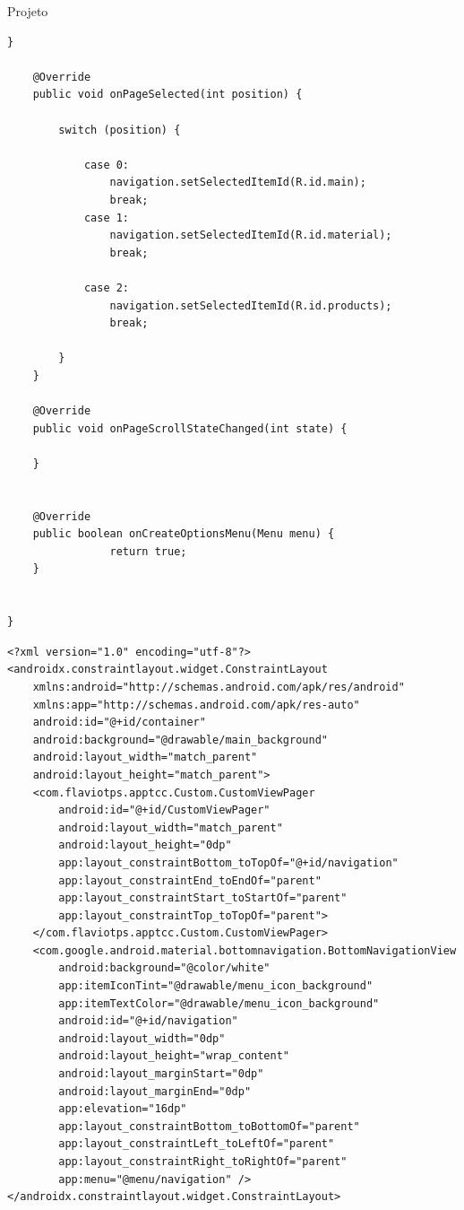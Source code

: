 \documentclass[
	12pt,				%
	openright,			%
	twoside,			%
	a4paper,			%
	english,			%
	french,				%
	spanish,			%
	brazil				%
	]{abntex2}
\begin{document}
\begin{chapter}{Projeto}
\begin{lstlisting}[numbers=none,
basicstyle=\small,
caption={MainActivity.java},
title={MainActivity.java},
label={MainActivity.java}]
    }

    @Override
    public void onPageSelected(int position) {

        switch (position) {

            case 0:
                navigation.setSelectedItemId(R.id.main);
                break;
            case 1:
                navigation.setSelectedItemId(R.id.material);
                break;

            case 2:
                navigation.setSelectedItemId(R.id.products);
                break;

        }
    }

    @Override
    public void onPageScrollStateChanged(int state) {

    }


    @Override
    public boolean onCreateOptionsMenu(Menu menu) {
                return true;
    }


}
\end{lstlisting}


\newpage
\begin{lstlisting}[numbers=none,
basicstyle=\small,
caption={Tela Principal.xml},
title={Tela Principal.xml},
label={activity_main.xml}]
<?xml version="1.0" encoding="utf-8"?>
<androidx.constraintlayout.widget.ConstraintLayout
    xmlns:android="http://schemas.android.com/apk/res/android"
    xmlns:app="http://schemas.android.com/apk/res-auto"
    android:id="@+id/container"
    android:background="@drawable/main_background"
    android:layout_width="match_parent"
    android:layout_height="match_parent">
    <com.flaviotps.apptcc.Custom.CustomViewPager
        android:id="@+id/CustomViewPager"
        android:layout_width="match_parent"
        android:layout_height="0dp"
        app:layout_constraintBottom_toTopOf="@+id/navigation"
        app:layout_constraintEnd_toEndOf="parent"
        app:layout_constraintStart_toStartOf="parent"
        app:layout_constraintTop_toTopOf="parent">
    </com.flaviotps.apptcc.Custom.CustomViewPager>
    <com.google.android.material.bottomnavigation.BottomNavigationView
        android:background="@color/white"
        app:itemIconTint="@drawable/menu_icon_background"
        app:itemTextColor="@drawable/menu_icon_background"
        android:id="@+id/navigation"
        android:layout_width="0dp"
        android:layout_height="wrap_content"
        android:layout_marginStart="0dp"
        android:layout_marginEnd="0dp"
        app:elevation="16dp"
        app:layout_constraintBottom_toBottomOf="parent"
        app:layout_constraintLeft_toLeftOf="parent"
        app:layout_constraintRight_toRightOf="parent"
        app:menu="@menu/navigation" />
</androidx.constraintlayout.widget.ConstraintLayout>
\end{lstlisting}


\end{chapter}
\end{document}
